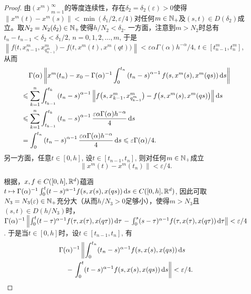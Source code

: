 \begin{proof}
    由$\left(x^m\right)_{m=1}^\infty$的等度连续性，存在$\delta_2=\delta_2(\varepsilon)>0$使得$\left\|x^m(t)-x^m(s)\right\|<\min \left(\delta_1/2,\allowbreak\varepsilon/4\right)$对任何$m\in \mathbb{N_+}$及$(s,t)\in D\left(\delta_2\right)$成立。取$N_2=N_2(\delta_2)\in \mathbb{N_+}$使得$h/N_2<\delta_2$. 一方面，注意到$m>N_2$时总有$t_n-t_{n-1}<\delta_2<\delta_1/2,\,n=0,1,2,\dots,m$, 于是$\left\|f\bigl(t,x^m_{n-1},x^m_{q^m_{n-1}}\bigr)-f\bigl(t,x^m(t),x^m(qt)\bigr)\right\|<\varepsilon \alpha \Gamma(\alpha) h^{-\alpha} / 4,\,t\in\left[t^m_{n-1},t^m_n\right]$, 从而
    \begin{equation}\label{tn}
        \begin{aligned}
            &\relphantom{\leqslant}\Gamma(\alpha)\left\|x^m(t_n)-x_0-\Gamma(\alpha)^{-1}\int_{0}^{t_n}\left(t_n-s\right)^{\alpha-1}f(s,x^m(s),x^m(qs))\differential s\right\|
            \\ &\leqslant \sum_{k=1}^{n}\int_{t_{k-1}}^{t_k}\left(t_n-s\right)^{\alpha-1}\left\|f\bigl(s,x^m_{k-1},x^m_{q^m_{k-1}}\bigr)-f\bigl(s,x^m(s),x^m(qs)\bigr)\right\|\differential s
            \\ &\leqslant \sum_{k=1}^{n}\int_{t_{k-1}}^{t_k}\left(t_n-s\right)^{\alpha-1} \frac{\varepsilon \alpha \Gamma(\alpha) h^{-\alpha}}{4} \differential s
            \\ &=\int_{0}^{t_n} \left(t_n-s\right)^{\alpha-1} \frac{\varepsilon \alpha \Gamma(\alpha) h^{-\alpha}}{4} \differential s
            \leqslant \varepsilon\Gamma(\alpha)/4.
        \end{aligned}
    \end{equation}
    另一方面，任意$t\in [0,h]$, 设$t\in\left[t_{n-1},t_n\right]$, 则对任何$m\in \mathbb{N_+}$成立
    \begin{equation}\label{xmtnt}
        \left\|x^m(t)-x^m(t_n)\right\|<\varepsilon/4.
    \end{equation}

    根据\cite[Proposition 3.2]{Webb}，$x,f\in C([0,h],\mathbb{R}^d)$蕴涵$t\mapsto \Gamma(\alpha)^{-1}\int_{0}^{t}(t-s)^{\alpha-1}f(s,x(s),x(qs))\mathop{}\!\mathrm{d} s\in C([0,h],\mathbb{R}^d)$, 因此可取$N_3=N_3(\varepsilon)\in \mathbb{N_+}$充分大（从而$h/N_3>0$足够小），使得$m>N_3$且$(s,t)\in D(h/N_3)$时，$\Gamma(\alpha)^{-1}\allowbreak\left\|\int_{0}^{t}(t-\tau)^{\alpha-1}f(\tau,x(\tau),x(q\tau))\mathop{}\!\mathrm{d} \tau\right.\allowbreak-\left.\int_{0}^{s}(s-\tau)^{\alpha-1}f(\tau,x(\tau),x(q\tau))\mathop{}\!\mathrm{d} \tau\right\|\allowbreak <\varepsilon/4$. 于是当$t\in [0,h]$时，设$t\in\left[t_{n-1},t_n\right]$, 有
    \begin{equation}\label{xtnt}
        \begin{multlined}
            \Gamma(\alpha)^{-1}\left\|\int_{0}^{t_n}(t_n-s)^{\alpha-1}f(s,x(s),x(qs))\differential s\right.
            \\-\left.\int_{0}^{t}(t-s)^{\alpha-1}f(s,x(s),x(qs))\differential s\right\|<\varepsilon/4.
        \end{multlined}
    \end{equation}
    

\end{proof}
